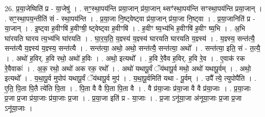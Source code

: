 \documentclass[17pt]{extarticle}
\begin{document}
26. प्र॒या॒जेष्विति॑ प्र - या॒जेषु॑ । . सꣳ॒॒स्था॒पय॑न्ति प्रया॒जान् प्र॑या॒जान् थ्सꣳ॑स्था॒पय॑न्ति सꣳस्था॒पय॑न्ति प्रया॒जान् । . सꣳ॒॒स्था॒पय॒न्तीति॑ सं - स्था॒पय॑न्ति । . प्र॒या॒जा नि॒ष्ट्वेष्ट्वा प्र॑या॒जान् प्र॑या॒जा नि॒ष्ट्वा । . प्र॒या॒जानिति॑ प्र - या॒जान् । . इ॒ष्ट्वा ह॒वीꣳषि॑ ह॒वीꣳषी॒ ष्ट्वेष्ट्वा ह॒वीꣳषि॑ । . ह॒वीꣳ ष्य॒भ्य॑भि ह॒वीꣳषि॑ ह॒वीꣳ ष्य॒भि । . अ॒भि घा॑रयति घारय त्य॒भ्य॑भि घा॑रयति । . घा॒र॒य॒ति॒ य॒ज्ञ्स्य॑ य॒ज्ञ्स्य॑ घारयति घारयति य॒ज्ञ्स्य॑ । . य॒ज्ञ्स्य॒ सन्त॑त्यै॒ सन्त॑त्यै य॒ज्ञ्स्य॑ य॒ज्ञ्स्य॒ सन्त॑त्यै । . सन्त॑त्या॒ अथो॒ अथो॒ सन्त॑त्यै॒ सन्त॑त्या॒ अथो᳚ । . सन्त॑त्या॒ इति॒ सं - त॒त्यै॒ । . अथो॑ ह॒विर्. ह॒वि रथो॒ अथो॑ ह॒विः । . अथो॒ इत्यथो᳚ । . ह॒वि रे॒वैव ह॒विर्. ह॒वि रे॒व । . ए॒वाक॑ रक रे॒वैवाकः॑ । . अ॒क॒ रथो॒ अथो॑ अक रक॒ रथो᳚ । . अथो॑ यथापू॒र्वं ॅय॑थापू॒र्व मथो॒ अथो॑ यथापू॒र्वम् । . अथो॒ इत्यथो᳚ । . य॒था॒पू॒र्व मुपोप॑ यथापू॒र्वं ॅय॑थापू॒र्व मुप॑ । . य॒था॒पू॒र्वमिति॑ यथा - पू॒र्वम् । . उपै᳚ त्ये॒ त्युपोपै॑ति । . ए॒ति॒ पि॒ता पि॒तै त्ये॑ति पि॒ता । . पि॒ता वै वै पि॒ता पि॒ता वै । . वै प्र॑या॒जाः प्र॑या॒जा वै वै प्र॑या॒जाः । . प्र॒या॒जाः प्र॒जा प्र॒जा प्र॑या॒जाः प्र॑या॒जाः प्र॒जा । . प्र॒या॒जा इति॑ प्र - या॒जाः । . प्र॒जा ऽनू॑या॒जा अ॑नूया॒जाः प्र॒जा प्र॒जा ऽनू॑या॒जाः । \newline
\end{document}

